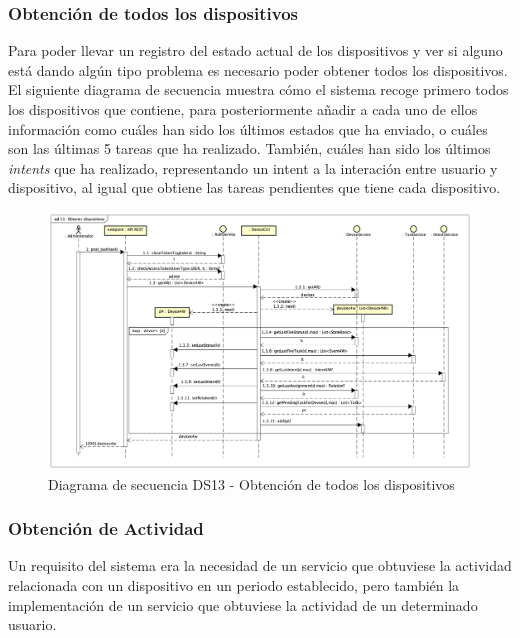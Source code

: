 \newpage
\subsubsection{Obtención de todos los dispositivos}

Para poder llevar un registro del estado actual de los dispositivos y ver si alguno está dando algún tipo problema es necesario poder obtener todos los dispositivos.
El siguiente diagrama de secuencia muestra cómo el sistema recoge primero todos los dispositivos que contiene, para posteriormente añadir a cada uno de ellos información como cuáles han sido los últimos estados que ha enviado, o cuáles son las últimas 5 tareas que ha realizado. También, cuáles han sido los últimos \textit{intents} que ha realizado, representando un intent a la interación entre usuario y dispositivo, al igual que obtiene las tareas pendientes que tiene cada dispositivo.

\begin{figure}[H]
    \centering
    \includegraphics[width=14cm]{./img/sequence/diagram/ObtenerDispositivos.png}
    \caption{Diagrama de secuencia DS13 - Obtención de todos los dispositivos}
    \label{fig:seq.GetDevices}
\end{figure}

\newpage
\subsubsection{Obtención de Actividad}

Un requisito del sistema era la necesidad de un servicio que obtuviese la actividad relacionada con un dispositivo en un periodo establecido, pero también la implementación de un servicio que obtuviese la actividad de un determinado usuario.

